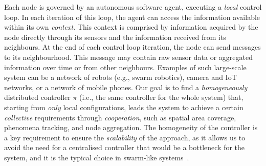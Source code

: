 \documentclass[conference]{IEEEtran}
\begin{document}
%
Each node is governed by an autonomous software agent, executing a \emph{local} control loop. In each iteration of this loop, the agent can access the information available within its own \emph{context}. This context is comprised by information acquired by the node directly through its sensors and the information received from its neighbours. 
%
At the end of each control loop iteration, the node can send messages to its neighbourhood. This message may contain raw sensor data or aggregated information over time or from other neighbours.
%
Examples of such large-scale system can be a network of robots (e.g., swarm robotics), camera and IoT networks, or a network of mobile phones.
%
Our goal is to find a \emph{homogeneously} distributed controller $\pi$ (i.e., the same controller for the whole system) that, 
 starting from \emph{only} local configurations, leads 
 the system to achieve a certain \emph{collective} requirements through \emph{cooperation}, 
 such as spatial area coverage, phenomena tracking, and node aggregation.
%
The homogeneity of the controller is a key requirement to ensure the \emph{scalability} of the approach, 
 as it allows us to avoid the need for a centralised controller that would be a bottleneck for the system,
 and it is the typical choice in swarm-like systems~\cite{brambilla2013swarm,yang2021many,pmlr-v80-yang18d,DBLP:conf/aaai/ZhengYCZZWY18}.
%
\end{document}
